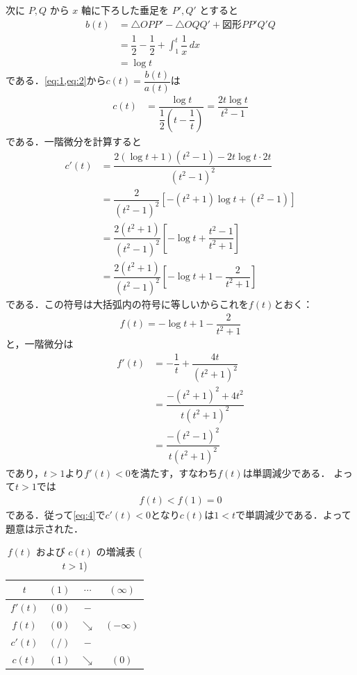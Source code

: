 \documentclass[../../main.tex]{subfiles}
\begin{document}
次に $P, Q$ から $x$ 軸に下ろした垂足を $P', Q'$ とすると
\begin{align}
  b(t)
  &= \triangle OPP' - \triangle OQQ' + \text{図形} PP'Q'Q \\
  &= \dfrac{1}{2} - \dfrac{1}{2} + \int_1^t \dfrac{1}{x} \, dx \\
  &= \log t \label{eq:2}
\end{align}
である．\cref{eq:1,eq:2}から$c(t)=\dfrac{b(t)}{a(t)}$は
\begin{align}
  c(t)
  &= \dfrac{\log t}{\dfrac{1}{2}\left(t - \dfrac{1}{t}\right)} = \dfrac{2t \log t}{t^2 - 1} \label{eq:3}
\end{align}
である．一階微分を計算すると
\begin{align}
  c'(t)
  &= \dfrac{2(\log t + 1)(t^2 - 1) - 2t \log t \cdot 2t}{(t^2 - 1)^2} \\
  &= \dfrac{2}{(t^2 - 1)^2} \left[ -(t^2 + 1)\log t + (t^2 - 1) \right] \\
  &= \dfrac{2(t^2 + 1)}{(t^2 - 1)^2} \left[ -\log t + \dfrac{t^2 - 1}{t^2 + 1} \right] \\
  &= \dfrac{2(t^2 + 1)}{(t^2 - 1)^2} \left[ -\log t + 1 - \dfrac{2}{t^2 + 1} \right]  \label{eq:4}
\end{align}
である．この符号は大括弧内の符号に等しいからこれを$f(t)$とおく：
\begin{align}
  f(t) = -\log t + 1 - \dfrac{2}{t^2 + 1}
\end{align}
と，一階微分は
\begin{align}
  f'(t)
  &= -\dfrac{1}{t} + \dfrac{4t}{(t^2 + 1)^2} \\
  &= \dfrac{-(t^2+1)^2+4t^2}{t(t^2 + 1)^2} \\
  &= \dfrac{-(t^2-1)^2}{t(t^2 + 1)^2}
\end{align}
であり，$t>1$より$f'(t)<0$を満たす，すなわち$f(t)$は単調減少である．
よって$t>1$では
\begin{align}
  f(t) < f(1) = 0
\end{align}
である．従って\cref{eq:4}で$c'(t)<0$となり$c(t)$は$1<t$で単調減少である．よって題意は示された．

\begin{table}[htb]
  \centering
  \caption{$f(t)$ および $c(t)$ の増減表 ($t > 1$)}
  \label{tab:ft_ct_monotonicity}
  \renewcommand{\arraystretch}{1.5}
  \begin{tabular}{c|ccc}
    $t$      & $(1)$     & $\cdots$   & $(\infty)$ \\ \hline
    $f'(t)$  & $(0)$     & $-$        &            \\ \hline
    $f(t)$   & $(0)$     & $\searrow$ & $(-\infty)$ \\ \hline
    $c'(t)$  & $(/)$   & $-$        &            \\ \hline
    $c(t)$   & $(1)$   & $\searrow$ & $(0)$      \\
  \end{tabular}
\end{table}
\end{document}
